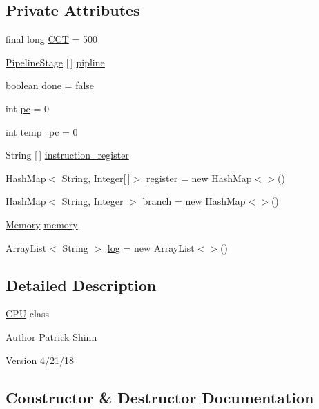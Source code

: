 \subsection*{Private Attributes}
\begin{DoxyCompactItemize}
\item 
final long \mbox{\hyperlink{class_c_p_u_a4bc1bb296266d8fc783899428e2a85be}{C\+CT}} = 500
\item 
\mbox{\hyperlink{class_pipeline_stage}{Pipeline\+Stage}} \mbox{[}$\,$\mbox{]} \mbox{\hyperlink{class_c_p_u_acf600c50fec0b0ecacf8797c1995c612}{pipline}}
\item 
boolean \mbox{\hyperlink{class_c_p_u_a9204a60bbd943820dade1682f1801817}{done}} = false
\item 
int \mbox{\hyperlink{class_c_p_u_ae44745460dee6c02a03992ce4b21737f}{pc}} = 0
\item 
int \mbox{\hyperlink{class_c_p_u_aa0ca73ce7dd3f5f7c8e5ab2afab7f674}{temp\+\_\+pc}} = 0
\item 
String \mbox{[}$\,$\mbox{]} \mbox{\hyperlink{class_c_p_u_ab98b435ffcf92f6c7c33992af4ebe43a}{instruction\+\_\+register}}
\item 
Hash\+Map$<$ String, Integer\mbox{[}$\,$\mbox{]}$>$ \mbox{\hyperlink{class_c_p_u_ad0e0d3c3fba51527836b44298c726438}{register}} = new Hash\+Map$<$$>$()
\item 
Hash\+Map$<$ String, Integer $>$ \mbox{\hyperlink{class_c_p_u_a68885d6fa08ae07e7901477e03a59831}{branch}} = new Hash\+Map$<$$>$()
\item 
\mbox{\hyperlink{class_memory}{Memory}} \mbox{\hyperlink{class_c_p_u_ab4c72eef96047317697752abe6b63d43}{memory}}
\item 
Array\+List$<$ String $>$ \mbox{\hyperlink{class_c_p_u_a8af34fe6dd70f31621f0a9e9773ac564}{log}} = new Array\+List$<$$>$()
\end{DoxyCompactItemize}


\subsection{Detailed Description}
\mbox{\hyperlink{class_c_p_u}{C\+PU}} class

\begin{DoxyAuthor}{Author}
Patrick Shinn 
\end{DoxyAuthor}
\begin{DoxyVersion}{Version}
4/21/18 
\end{DoxyVersion}


\subsection{Constructor \& Destructor Documentation}
\mbox{\label{class_c_p_u_a87583bf8515df1ec28ee821d277b4da3}} 
